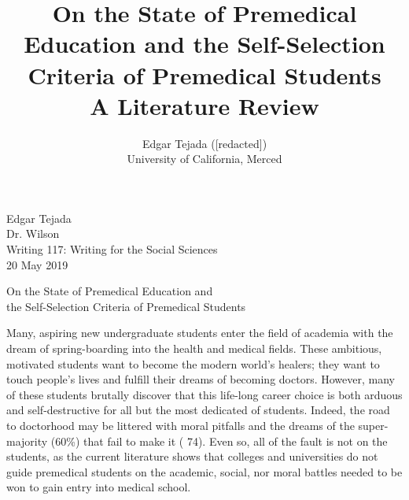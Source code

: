 \documentclass [12pt]{article}
\title{On the State of Premedical Education and the Self-Selection Criteria of Premedical Students \\\medskip A Literature Review}
\author{Edgar Tejada ([redacted])\\University of California, Merced}
\begin{document}
\begin{flushleft}
Edgar Tejada\\
Dr. Wilson\\
Writing 117: Writing for the Social Sciences\\
20 May 2019\\


\begin{center}
	On the State of Premedical Education and \\the Self-Selection Criteria of Premedical Students
\end{center}


\setlength{\parindent}{0.5in}
Many, aspiring new undergraduate students enter the field of academia with the dream of spring-boarding into the health and medical fields. These ambitious, motivated students want to become the modern world's healers; they want to touch people's lives and fulfill their dreams of becoming doctors. However, many of these students brutally discover that this life-long career choice is both arduous and self-destructive for all but the most dedicated of students. Indeed, the road to doctorhood may be littered with moral pitfalls and the dreams of the super-majority (60\%) that fail to make it (\cite{Olsen-2016} 74). Even so, all of the fault is not on the students, as the current literature shows that colleges and universities do not guide premedical students on the academic, social, nor moral battles needed to be won to gain entry into medical school.


\end{flushleft}
\end{document}
